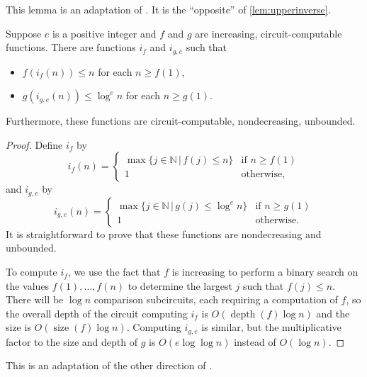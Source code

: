 \documentclass{article}
\DeclareMathOperator{\depth}{depth}
\DeclareMathOperator{\size}{size}
\begin{document}
This lemma is an adaptation of \autocite[Lemma~3.24]{fg06}.
It is the ``opposite'' of \autoref{lem:upperinverse}.

\begin{lemma}\label{lem:lowerinverse}
  Suppose $e$ is a positive integer and $f$ and $g$ are increasing, circuit-computable functions.
  There are functions $i_f$ and $i_{g, e}$ such that
  \begin{itemize}
  \item $f(i_f(n)) \leq n$ for each $n \geq f(1)$,
  \item $g(i_{g, e}(n)) \leq \log^e n$ for each $n \geq g(1)$.
  \end{itemize}
  Furthermore, these functions are circuit-computable, nondecreasing, unbounded.
\end{lemma}
\begin{proof}
  Define $i_f$ by
  \[
  i_f(n) = \begin{cases}
    \max\{ j \in \mathbb{N} \, | \, f(j) \leq n\} & \text{if } n \geq f(1) \\
    1 & \text{otherwise},
  \end{cases}
  \]
  and $i_{g, e}$ by
  \[
  i_{g, e}(n) = \begin{cases}
    \max\{ j \in \mathbb{N} \, | \, g(j) \leq \log^e n\} & \text{if } n \geq g(1) \\
    1 & \text{otherwise}.
  \end{cases}
  \]
  It is straightforward to prove that these functions are nondecreasing and unbounded.

  To compute $i_f$, we use the fact that $f$ is increasing to perform a binary search on the values $f(1), \dotsc, f(n)$ to determine the largest $j$ such that $f(j) \leq n$.
  There will be $\log n$ comparison subcircuits, each requiring a computation of $f$, so the overall depth of the circuit computing $i_f$ is $O(\depth(f) \log n)$ and the size is $O(\size(f) \log n)$.
  Computing $i_{g, e}$ is similar, but the multiplicative factor to the size and depth of $g$ is $O(e \log \log n)$ instead of $O(\log n)$.
\end{proof}

This is an adaptation of the other direction of \autocite[Theorem~3.29]{fg06}.
\end{document}
